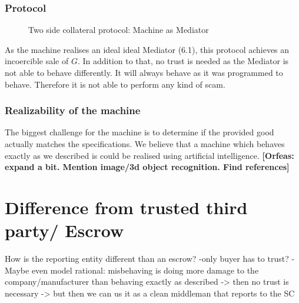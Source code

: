 \documentclass{cacthesis}
\newcommand{\authnote}[3]{{ \footnotesize \textbf{#1[#2: #3]~}}}
\newcommand{\orfnote}[1]{\authnote{\color{blue}}{Orfeas}{#1}}
\begin{document}
\subsubsection{Protocol}
\begin{figure}[htb!]
    \centering
    \caption{Two side collateral protocol: Machine as Mediator}
    \label{pro:two-side-collateral-machine}
\end{figure}

As the machine realises an ideal ideal Mediator (6.1), this protocol achieves an incoercible sale of $G$.\newline
In addition to that, no trust is needed as the Mediator is not able to behave differently. It will always behave as it was programmed to behave. Therefore it is not able to perform any kind of scam.

\subsubsection{Realizability of the machine} 
The biggest challenge for the machine is to determine if the provided good actually matches the specifications.\newline
We believe that a machine which behaves exactly as we described is could be
realised using artificial intelligence. \orfnote{expand a bit. Mention image/3d
object recognition. Find references}
\section{Difference from trusted third party/ Escrow}
How is the reporting entity different than an escrow?
-only buyer has to trust?
-Maybe even model rational: misbehaving is doing more damage to the company/manufacturer than behaving exactly as described -> then no trust is necessary -> but then we can us it as a clean middleman that reports to the SC
\end{document}
